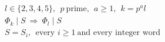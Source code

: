 \documentclass{article}
\begin{document}
\[
\begin{aligned}
&l\in\{2,3,4,5\},\ \ p\ \text{prime},\ \ a\ge1,\ \ k=p^{a}l\\
&\Phi_k\mid S\ \Longrightarrow\ \Phi_l\mid S\\
&S=S_i,\ \ \text{every }i\ge1\ \text{and every integer word}
\end{aligned}
\]
\end{document}
